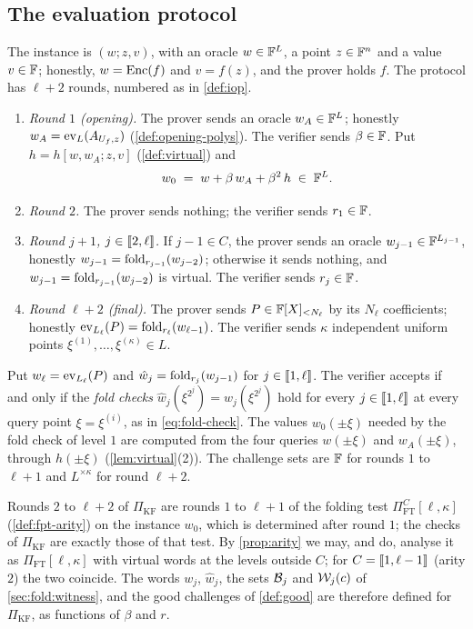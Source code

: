 \subsection{The evaluation protocol}\label{sec:scheme:protocol}

\begin{definition}\label{def:pikf}
The instance is $(w; z, v)$, with an oracle $w \in \mathbb{F}^L$, a point $z \in \mathbb{F}^n$ and a value $v \in \mathbb{F}$; honestly, $w = \mathrm{Enc}(f)$ and $v = f(z)$, and the prover holds $f$.
The protocol has $\ell + 2$ rounds, numbered as in \cref{def:iop}.
\begin{enumerate}
  \item \emph{Round $1$ (opening).} The prover sends an oracle $w_A \in \mathbb{F}^L$; honestly $w_A = \mathrm{ev}_L(A_{U_f,z})$ (\cref{def:opening-polys}). The verifier sends $\beta \in \mathbb{F}$. Put $h = h[w, w_A; z, v]$ (\cref{def:virtual}) and
  \[
    w_0 \;=\; w + \beta\, w_A + \beta^2\, h \;\in\; \mathbb{F}^L.
  \]
  \item \emph{Round $2$.} The prover sends nothing; the verifier sends $r_1 \in \mathbb{F}$.
  \item \emph{Round $j+1$, $j \in \llbracket 2, \ell \rrbracket$.} If $j - 1 \in C$, the prover sends an oracle $w_{j-1} \in \mathbb{F}^{L_{j-1}}$, honestly $w_{j-1} = \mathrm{fold}_{r_{j-1}}(w_{j-2})$; otherwise it sends nothing, and $w_{j-1} = \mathrm{fold}_{r_{j-1}}(w_{j-2})$ is virtual. The verifier sends $r_j \in \mathbb{F}$.
  \item \emph{Round $\ell+2$ (final).} The prover sends $P \in \mathbb{F}[X]_{<N_\ell}$ by its $N_\ell$ coefficients; honestly $\mathrm{ev}_{L_\ell}(P) = \mathrm{fold}_{r_\ell}(w_{\ell-1})$. The verifier sends $\kappa$ independent uniform points $\xi^{(1)}, \dots, \xi^{(\kappa)} \in L$.
\end{enumerate}
Put $w_\ell = \mathrm{ev}_{L_\ell}(P)$ and $\hat w_j = \mathrm{fold}_{r_j}(w_{j-1})$ for $j \in \llbracket 1, \ell \rrbracket$. The verifier accepts if and only if the \emph{fold checks} $\hat w_j(\xi^{2^j}) = w_j(\xi^{2^j})$ hold for every $j \in \llbracket 1, \ell \rrbracket$ at every query point $\xi = \xi^{(i)}$, as in \eqref{eq:fold-check}.
The values $w_0(\pm\xi)$ needed by the fold check of level $1$ are computed from the four queries $w(\pm\xi)$ and $w_A(\pm\xi)$, through $h(\pm\xi)$ (\cref{lem:virtual}(2)).
The challenge sets are $\mathbb{F}$ for rounds $1$ to $\ell+1$ and $L^{\times\kappa}$ for round $\ell+2$.
\end{definition}

Rounds $2$ to $\ell+2$ of $\Pi_{\mathrm{KF}}$ are rounds $1$ to $\ell+1$ of the folding test $\Pi^C_{\mathrm{FT}}[\ell,\kappa]$ (\cref{def:fpt-arity}) on the instance $w_0$, which is determined after round $1$; the checks of $\Pi_{\mathrm{KF}}$ are exactly those of that test. By \cref{prop:arity} we may, and do, analyse it as $\Pi_{\mathrm{FT}}[\ell,\kappa]$ with virtual words at the levels outside $C$; for $C = \llbracket 1, \ell-1 \rrbracket$ (arity $2$) the two coincide.
The words $w_j$, $\hat w_j$, the sets $\mathcal{B}_j$ and $\mathcal{W}_j(c)$ of \cref{sec:fold:witness}, and the good challenges of \cref{def:good} are therefore defined for $\Pi_{\mathrm{KF}}$, as functions of $\beta$ and $r$.

